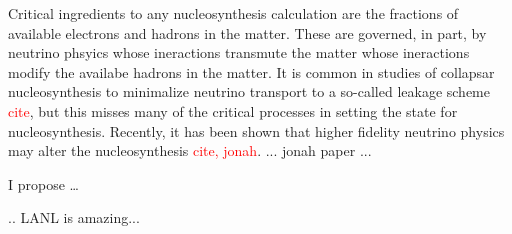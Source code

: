 \documentclass[12pt]{article}
\begin{document}
Critical ingredients to any nucleosynthesis calculation are the fractions of available electrons and hadrons in the matter.
These are governed, in part, by neutrino phsyics whose ineractions transmute the matter whose ineractions modify the availabe hadrons in the matter.
It is common in studies of collapsar nucleosynthesis to minimalize neutrino transport to a so-called leakage scheme \textcolor{red}{cite}, but this misses many of the critical processes in setting the state for nucleosynthesis.
Recently, it has been shown that higher fidelity neutrino physics may alter the nucleosynthesis \textcolor{red}{cite, jonah}.
... jonah paper ...

I propose \dots

.. LANL is amazing...


\newpage

\setcounter{page}{1}  \renewcommand{\thepage}
           {Bibliography -- \arabic{page}}

\renewcommand\bibsection{\section*{References}}
\setlength{\bibsep}{2pt}



\end{document}
